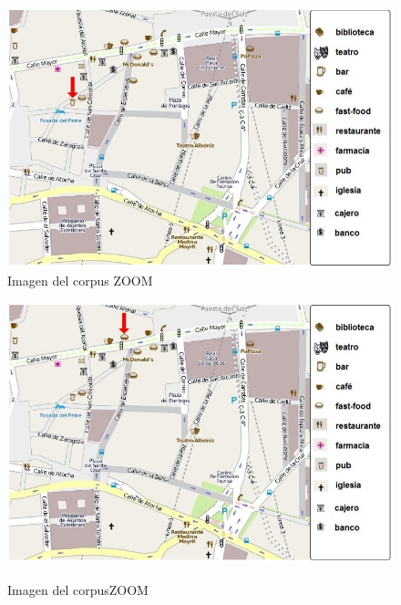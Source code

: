 \begin{figure}
\begin{minipage}[b]{0.5\linewidth}
\centering
\includegraphics[width=\textwidth]{images/corpus/mapa3.png}\\[0pt]
\caption{Imagen del corpus ZOOM}
\label{mapa3}
\end{minipage}
\hspace*{0cm}
\begin{minipage}[b]{0.5\linewidth}
\centering
\includegraphics[width=\textwidth]{images/corpus/mapa4.png}\\[0pt]
\caption{Imagen del corpusZOOM}
\label{mapa4}
\end{minipage}
\end{figure}

